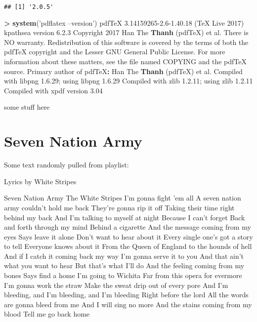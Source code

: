 \documentclass[numberinsequence]{krantz}
\makeatletter
\newenvironment{Shaded}{\begin{snugshade}}{\end{snugshade}}
\newcommand{\DecValTok}[1]{\textcolor[rgb]{0.00,0.00,0.81}{#1}}
\newcommand{\FloatTok}[1]{\textcolor[rgb]{0.00,0.00,0.81}{#1}}
\newcommand{\KeywordTok}[1]{\textcolor[rgb]{0.13,0.29,0.53}{\textbf{#1}}}
\newcommand{\NormalTok}[1]{#1}
\newcommand{\OperatorTok}[1]{\textcolor[rgb]{0.81,0.36,0.00}{\textbf{#1}}}
\newcommand{\StringTok}[1]{\textcolor[rgb]{0.31,0.60,0.02}{#1}}
\newenvironment{kframe}{%
\medskip{}
\setlength{\fboxsep}{.8em}
 \def\at@end@of@kframe{}%
 \ifinner\ifhmode%
  \def\at@end@of@kframe{\end{minipage}}%
  \begin{minipage}{\columnwidth}%
 \fi\fi%
 \def\FrameCommand##1{\hskip\@totalleftmargin \hskip-\fboxsep
 \colorbox{shadecolor}{##1}\hskip-\fboxsep
     \hskip-\linewidth \hskip-\@totalleftmargin \hskip\columnwidth}%
 \MakeFramed {\advance\hsize-\width
   \@totalleftmargin\z@ \linewidth\hsize
   \@setminipage}}%
 {\par\unskip\endMakeFramed%
 \at@end@of@kframe}
\renewenvironment{Shaded}{\begin{kframe}}{\end{kframe}}
\makeatother
\begin{document}
\begin{verbatim}
## [1] '2.0.5'
\end{verbatim}

\begin{Shaded}
\begin{Highlighting}[]
\OperatorTok{>}\StringTok{ }\KeywordTok{system}\NormalTok{(}\StringTok{'pdflatex --version'}\NormalTok{)}
\NormalTok{pdfTeX }\FloatTok{3.14159265-2.6}\DecValTok{-1}\NormalTok{.}\FloatTok{40.18}\NormalTok{ (TeX Live }\DecValTok{2017}\NormalTok{)}
\NormalTok{kpathsea version }\DecValTok{6}\NormalTok{.}\FloatTok{2.3}
\NormalTok{Copyright }\DecValTok{2017}\NormalTok{ Han The }\KeywordTok{Thanh}\NormalTok{ (pdfTeX) et al.}
\NormalTok{There is NO warranty.  Redistribution of this software is}
\NormalTok{covered by the terms of both the pdfTeX copyright and}
\NormalTok{the Lesser GNU General Public License.}
\NormalTok{For more information about these matters, see the file}
\NormalTok{named COPYING and the pdfTeX source.}
\NormalTok{Primary author of pdfTeX}\OperatorTok{:}\StringTok{ }\NormalTok{Han The }\KeywordTok{Thanh}\NormalTok{ (pdfTeX) et al.}
\NormalTok{Compiled with libpng }\DecValTok{1}\NormalTok{.}\FloatTok{6.29}\NormalTok{; using libpng }\DecValTok{1}\NormalTok{.}\FloatTok{6.29}
\NormalTok{Compiled with zlib }\DecValTok{1}\NormalTok{.}\FloatTok{2.11}\NormalTok{; using zlib }\DecValTok{1}\NormalTok{.}\FloatTok{2.11}
\NormalTok{Compiled with xpdf version }\FloatTok{3.04}
\end{Highlighting}
\end{Shaded}

\mainmatter

some stuff here

\hypertarget{intro-intro}{%
\section{Seven Nation Army}\label{intro-intro}}

Some text randomly pulled from playlist:

Lyrics by White Stripes

Seven Nation Army The White Stripes I'm gonna fight 'em all A seven
nation army couldn't hold me back They're gonna rip it off Taking their
time right behind my back And I'm talking to myself at night Because I
can't forget Back and forth through my mind Behind a cigarette And the
message coming from my eyes Says leave it alone Don't want to hear about
it Every single one's got a story to tell Everyone knows about it From
the Queen of England to the hounds of hell And if I catch it coming back
my way I'm gonna serve it to you And that ain't what you want to hear
But that's what I'll do And the feeling coming from my bones Says find a
home I'm going to Wichita Far from this opera for evermore I'm gonna
work the straw Make the sweat drip out of every pore And I'm bleeding,
and I'm bleeding, and I'm bleeding Right before the lord All the words
are gonna bleed from me And I will sing no more And the stains coming
from my blood Tell me go back home
\end{document}
